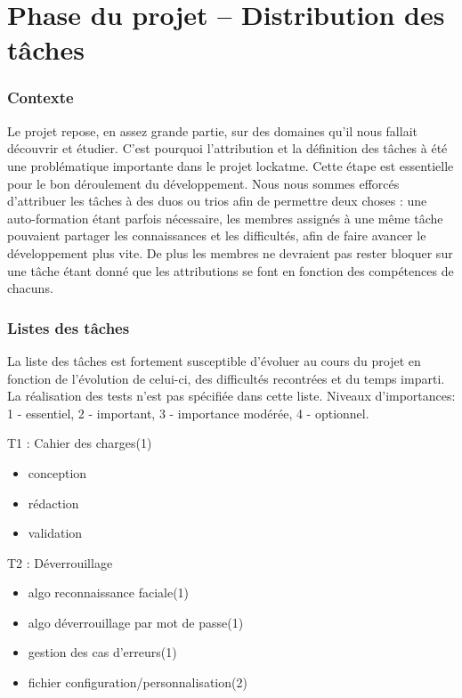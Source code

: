 \part{Phase du projet -- Distribution des tâches}
\section{Contexte}
Le projet repose, en assez grande partie, sur des domaines qu’il nous
fallait découvrir et étudier. C’est pourquoi l’attribution et la définition
des tâches à été une problématique importante dans le projet lockatme.
Cette étape est essentielle pour le bon déroulement du développement.
Nous nous sommes efforcés d’attribuer les tâches à des duos ou trios afin de
permettre deux choses : une auto-formation étant parfois nécessaire, les
membres assignés à une même tâche pouvaient partager les connaissances et les
difficultés, afin de faire avancer le développement plus vite. De plus les
membres ne devraient pas rester bloquer sur une tâche étant donné que les
attributions se font en fonction des compétences de chacuns.

\section{Listes des tâches}
La liste des tâches est fortement susceptible d’évoluer au cours du projet en
fonction de l’évolution de celui-ci, des difficultés recontrées et du temps
imparti. La réalisation des tests n’est pas spécifiée dans cette liste.
Niveaux d’importances: 1 - essentiel, 2 - important, 3 - importance modérée,
4 - optionnel.

\vspace {0.5cm}

T1 : Cahier des charges(1)
\begin{itemize}
  \item{conception}
  \item{rédaction}
  \item{validation}
\end{itemize}

T2 : Déverrouillage
\begin{itemize}
  \item{algo reconnaissance faciale(1)}
  \item{algo déverrouillage par mot de passe(1)}
  \item{gestion des cas d’erreurs(1)}
  \item{fichier configuration/personnalisation(2)}
\end{itemize}

